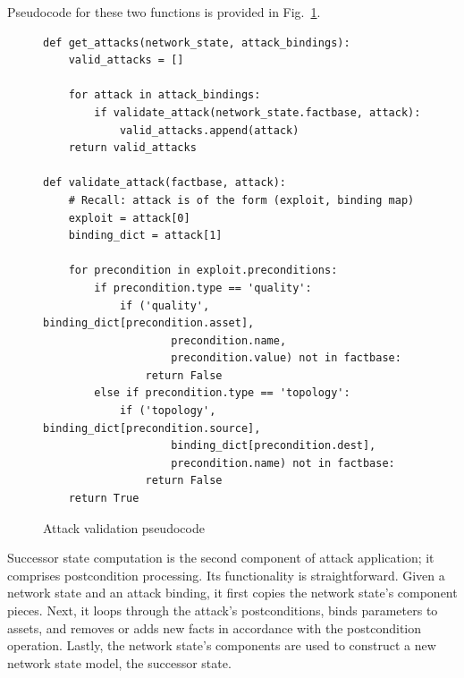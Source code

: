 Pseudocode for these two functions is provided in Fig.~\ref{fig:get_attacks_pc}.

\begin{figure}
\begin{lstlisting}
def get_attacks(network_state, attack_bindings):
    valid_attacks = []
    
    for attack in attack_bindings:
        if validate_attack(network_state.factbase, attack):
            valid_attacks.append(attack)
    return valid_attacks

def validate_attack(factbase, attack):
    # Recall: attack is of the form (exploit, binding map)
    exploit = attack[0]
    binding_dict = attack[1]
    
    for precondition in exploit.preconditions:
        if precondition.type == 'quality':
            if ('quality', binding_dict[precondition.asset], 
                    precondition.name, 
                    precondition.value) not in factbase:
                return False
        else if precondition.type == 'topology':
            if ('topology', binding_dict[precondition.source], 
                    binding_dict[precondition.dest],
                    precondition.name) not in factbase:
                return False
    return True
\end{lstlisting}
\label{fig:get_attacks_pc}
\caption{Attack validation pseudocode}
\end{figure}
Successor state computation is the second component of attack application;
it comprises postcondition processing. Its functionality is straightforward.
Given a network state and an attack binding, it first copies the network state's
component pieces. Next, it loops through the attack's
postconditions, binds parameters to assets, and removes or adds new facts
in accordance with the postcondition operation. Lastly, the network state's
components are used to construct a new network state model, the successor
state.


